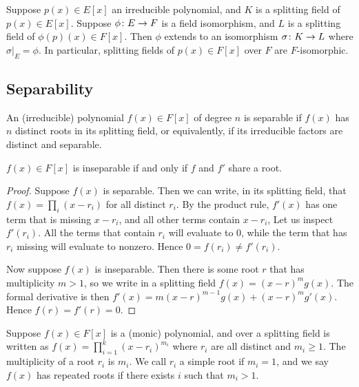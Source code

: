 \begin{theorem}
    Suppose \(p(x) \in E[x]\) an irreducible polynomial,
    and \(K\) is a splitting field of \(p(x) \in E[x]\).
    Suppose \(\phi\colon E\to F\) is a field isomorphism,
    and \(L\) is a splitting field of \(\phi(p)(x) \in F[x]\).
    Then \(\phi\) extends to an isomorphism \(\sigma\colon K\to L\)
    where \(\sigma\vert_E = \phi\).
    In particular, splitting fields of \(p(x) \in F[x]\) over \(F\)
    are \(F\)-isomorphic.
\end{theorem}


\subsection{Separability}

\begin{definition}
    An (irreducible) polynomial \(f(x) \in F[x]\) of degree \(n\)
    is separable if \(f(x)\) has \(n\) distinct roots in its splitting field,
    or equivalently, if its irreducible factors are distinct and separable.
\end{definition}
\begin{proposition}\label{prop:derivative-inseparability}
    \(f(x) \in F[x]\) is inseparable
    if and only if \(f\) and \(f'\) share a root.
\end{proposition}
\begin{proof}
    Suppose \(f(x)\) is separable.
    Then we can write, in its splitting field,
    that \(f(x) = \prod_i (x-r_i)\) for all distinct \(r_i\).
    By the product rule,
    \(f'(x)\) has one term that is missing \(x-r_i\),
    and all other terms contain \(x-r_i\),
    Let us inspect \(f'(r_i)\).
    All the terms that contain \(r_i\) will evaluate to 0,
    while the term that has \(r_i\) missing will evaluate to nonzero.
    Hence \(0 = f(r_i) \neq f'(r_i)\).

    Now suppose \(f(x)\) is inseparable.
    Then there is some root \(r\) that has multiplicity \(m > 1\),
    so we write in a splitting field \(f(x) = {(x-r)}^m g(x)\).
    The formal derivative is then \(f'(x) = m{(x-r)}^{m-1} g(x) + {(x-r)}^m g'(x)\).
    Hence \(f(r) = f'(r) = 0\).
\end{proof}

\begin{definition}
    Suppose \(f(x) \in F[x]\) is a (monic) polynomial,
    and over a splitting field is written as
    \(f(x) = \prod_{i=1}^k {(x-r_i)}^{m_i}\)
    where \(r_i\) are all distinct and \(m_i \geq 1\).
    The multiplicity of a root \(r_i\) is \(m_i\).
    We call \(r_i\) a simple root if \(m_i = 1\),
    and we say \(f(x)\) has repeated roots if there exists \(i\)
    such that \(m_i > 1\).
\end{definition}

